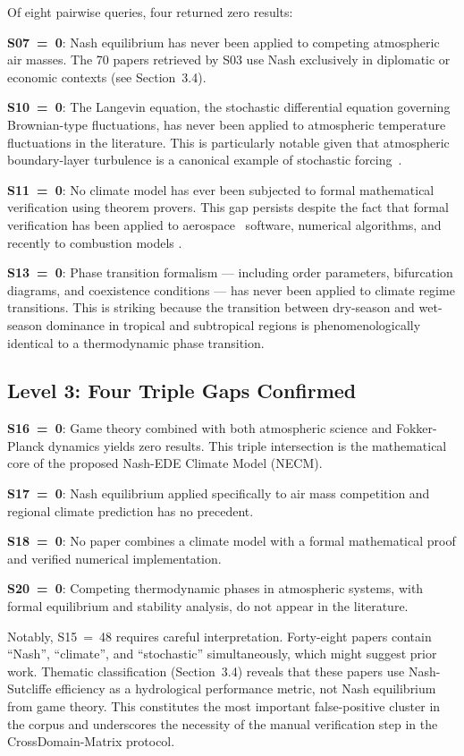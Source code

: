 \documentclass[gmd, manuscript]{copernicus}
\begin{document}
Of eight pairwise queries, four returned zero results:

\textbf{S07~=~0}: Nash equilibrium has never been applied to competing
atmospheric air masses. The 70 papers retrieved by S03 use Nash
exclusively in diplomatic or economic contexts (see Section~3.4).

\textbf{S10~=~0}: The Langevin equation, the stochastic differential
equation governing Brownian-type fluctuations, has never been applied
to atmospheric temperature fluctuations in the literature. This is
particularly notable given that atmospheric boundary-layer turbulence
is a canonical example of stochastic forcing~\citep{Hasselmann1976}.

\textbf{S11~=~0}: No climate model has ever been subjected to formal
mathematical verification using theorem provers. This gap persists
despite the fact that formal verification has been applied to aerospace~\citep{ModelChecking2018}
software, numerical algorithms, and recently to combustion models
\citep{LeanFour2021}.

\textbf{S13~=~0}: Phase transition formalism — including order parameters,
bifurcation diagrams, and coexistence conditions — has never been applied
to climate regime transitions. This is striking because the transition
between dry-season and wet-season dominance in tropical and subtropical
regions is phenomenologically identical to a thermodynamic phase transition.

\subsection{Level 3: Four Triple Gaps Confirmed}

\textbf{S16~=~0}: Game theory combined with both atmospheric science and
Fokker-Planck dynamics yields zero results. This triple intersection
is the mathematical core of the proposed Nash-EDE Climate Model (NECM).

\textbf{S17~=~0}: Nash equilibrium applied specifically to air mass
competition and regional climate prediction has no precedent.

\textbf{S18~=~0}: No paper combines a climate model with a formal
mathematical proof and verified numerical implementation.

\textbf{S20~=~0}: Competing thermodynamic phases in atmospheric systems,
with formal equilibrium and stability analysis, do not appear in the
literature.

Notably, S15~=~48 requires careful interpretation. Forty-eight papers
contain ``Nash'', ``climate'', and ``stochastic'' simultaneously, which
might suggest prior work. Thematic classification (Section~3.4) reveals
that these papers use Nash-Sutcliffe efficiency as a hydrological
performance metric, not Nash equilibrium from game theory. This
constitutes the most important false-positive cluster in the corpus and
underscores the necessity of the manual verification step in the
CrossDomain-Matrix protocol.
\end{document}
